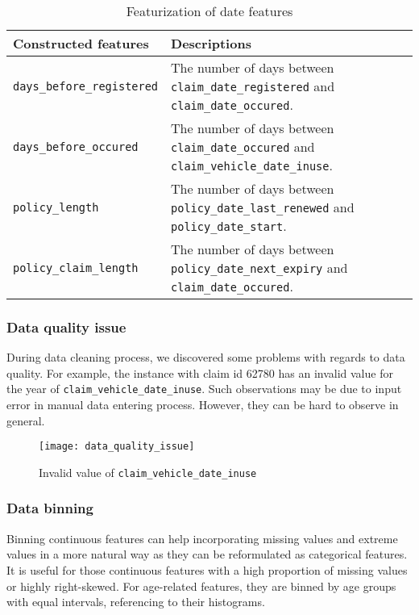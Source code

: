 \documentclass[12pt]{article}
\begin{document}
\begin{table}[h]
	\begin{tabular}{|l|p{11.5cm}|}
	\hline
	Constructed features & Descriptions\\
	\hline
	\texttt{days\_before\_registered} & The number of days between \texttt{claim\_date\_registered} and \texttt{claim\_date\_occured}.\\
	\hline
	\texttt{days\_before\_occured} & The number of days between \texttt{claim\_date\_occured} and \texttt{claim\_vehicle\_date\_inuse}.\\
	\hline
	\texttt{policy\_length} & The number of days between \texttt{policy\_date\_last\_renewed} and \texttt{policy\_date\_start}.\\
	\hline
	\texttt{policy\_claim\_length} & The number of days between \texttt{policy\_date\_next\_expiry} and \texttt{claim\_date\_occured}.\\
	\hline
	\end{tabular}
	\caption{Featurization of date features}
\end{table}

\vspace{-1cm}
\subsubsection*{Data quality issue}

During data cleaning process, we discovered some problems with regards to data quality. For example, the instance with claim id 62780 has an invalid value for the year of \texttt{claim\_vehicle\_date\_inuse}. Such observations may be due to input error in manual data entering process. However, they can be hard to observe in general.

\begin{figure}[h]
\centering
\texttt{[image: data\_quality\_issue]}
\caption{Invalid value of \texttt{claim\_vehicle\_date\_inuse}}
\end{figure}

\vspace{-1cm}
\subsubsection*{Data binning}

Binning continuous features can help incorporating missing values and extreme values in a more natural way as they can be reformulated as categorical features. It is useful for those continuous features with a high proportion of missing values or highly right-skewed. For age-related features, they are binned by age groups with equal intervals, referencing to their histograms.
\end{document}
